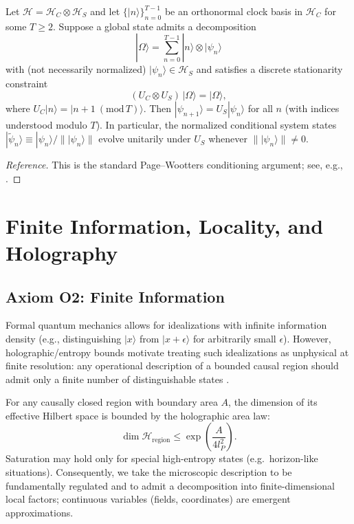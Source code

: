 \begin{proposition}
\label{prop:page_wootters_conditional}
Let $\mathcal{H}=\mathcal{H}_{C}\otimes\mathcal{H}_{S}$ and let $\{|n\rangle\}_{n=0}^{T-1}$ be an orthonormal clock basis in $\mathcal{H}_C$ for some $T\ge 2$. Suppose a global state admits a decomposition
\begin{equation}
    |\Omega\rangle=\sum_{n=0}^{T-1} |n\rangle\otimes|\psi_n\rangle
\end{equation}
with (not necessarily normalized) $|\psi_n\rangle\in\mathcal{H}_S$ and satisfies a discrete stationarity constraint
\begin{equation}
    (U_C\otimes U_S)\,|\Omega\rangle=|\Omega\rangle,
\end{equation}
where $U_C|n\rangle=|n{+}1\ (\mathrm{mod}\,T)\rangle$. Then $|\psi_{n+1}\rangle=U_S|\psi_n\rangle$ for all $n$ (with indices understood modulo $T$). In particular, the normalized conditional system states $|\tilde\psi_n\rangle\equiv |\psi_n\rangle/\||\psi_n\rangle\|$ evolve unitarily under $U_S$ whenever $\||\psi_n\rangle\|\neq 0$.
\end{proposition}
\begin{proof}[Reference]
This is the standard Page--Wootters conditioning argument; see, e.g., \cite{PageWootters1983}.
\end{proof}

\section{Finite Information, Locality, and Holography}
\label{chap:axioms_structure}

\subsection{Axiom O2: Finite Information}
Formal quantum mechanics allows for idealizations with infinite information density (e.g., distinguishing $|x\rangle$ from $|x+\epsilon\rangle$ for arbitrarily small $\epsilon$). However, holographic/entropy bounds motivate treating such idealizations as unphysical at finite resolution: any operational description of a bounded causal region should admit only a finite number of distinguishable states \cite{bekenstein1973black,hawking1975particle,thooft1993dimensional,susskind1995world,Bousso2002}.

\begin{axiom}
For any causally closed region with boundary area $A$, the dimension of its effective Hilbert space is bounded by the holographic area law:
\begin{equation}
    \dim \mathcal{H}_{\text{region}} \le \exp\left(\frac{A}{4 l_P^2}\right).
\end{equation}
Saturation may hold only for special high-entropy states (e.g.\ horizon-like situations). Consequently, we take the microscopic description to be fundamentally regulated and to admit a decomposition into finite-dimensional local factors; continuous variables (fields, coordinates) are emergent approximations.
\end{axiom}

